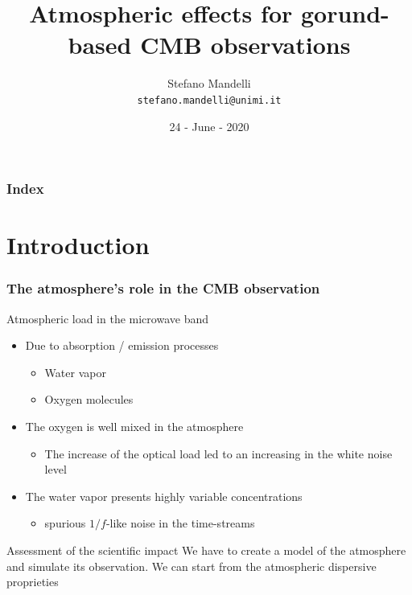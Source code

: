 \documentclass[aspectratio=169]{beamer}
\title[Atmospheric Effects]{Atmospheric effects for gorund-based CMB observations}
\author[Mandelli S.]{Stefano Mandelli \\ \texttt{stefano.mandelli@unimi.it}}
\date[STRIPConf]{24 - June - 2020}
\institute[UNIMI - INFN]{Universit\`a degli Studi di Milano - Istituto Nazionale di Fisica Nucleare}
\begin{document}
\begin{frame}
	\maketitle
\end{frame}

\begin{frame}
    \frametitle{Index}
    \centering
    \tableofcontents
\end{frame}

\section{Introduction}
\begin{frame}
    \frametitle{The atmosphere's role in the CMB observation}
    \begin{block}{Atmospheric load in the microwave band}
        \begin{itemize}[<+->]
            \item Due to absorption / emission processes
            \begin{itemize}
                \item Water vapor
                \item Oxygen molecules
            \end{itemize}
            \item The oxygen is well mixed in the atmosphere
            \begin{itemize}
                \item The increase of the optical load led to an increasing in the white noise level
            \end{itemize}
            \item The water vapor presents highly variable concentrations
            \begin{itemize}
                \item spurious $1/f$-like noise in the time-streams
            \end{itemize}
        \end{itemize}
    \end{block}

    \begin{alertblock}{Assessment of the scientific impact}
        We have to create a model of the atmosphere and simulate its observation. We can start from the atmospheric dispersive proprieties
    \end{alertblock}


\end{frame}
\end{document}
